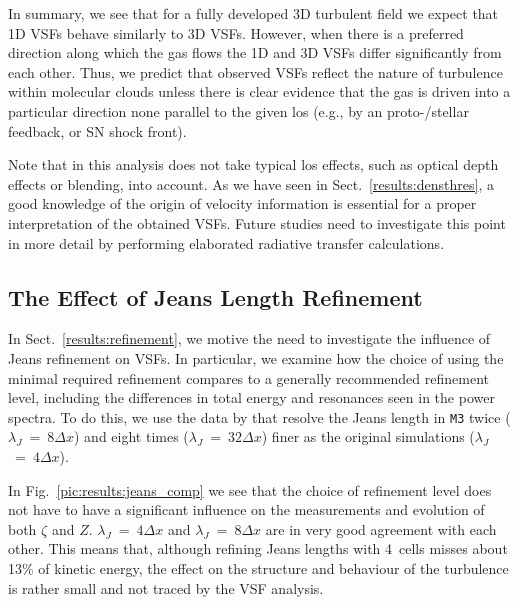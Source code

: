 In summary, we see that for a fully developed 3D turbulent field we expect that 1D VSFs behave similarly to 3D VSFs.
However, when there is a preferred direction along which the gas flows the 1D and 3D VSFs differ significantly from each other. 
Thus, we predict that observed VSFs reflect the nature of turbulence within molecular clouds unless there is clear evidence that the gas is driven into a particular direction none parallel to the given los (e.g., by an proto-/stellar feedback, or SN shock front).

Note that in this analysis does not take typical los effects, such as optical depth effects or blending, into account. 
As we have seen in Sect.~\ref{results:densthres}, a good knowledge of the origin of velocity information is essential for a proper interpretation of the obtained VSFs.
Future studies need to investigate this point in more detail by performing elaborated radiative transfer calculations. 



\subsection{The Effect of Jeans Length Refinement}\label{discussion:refinement}

In Sect.~\ref{results:refinement}, we motive the need to investigate the influence of Jeans refinement on VSFs.
In particular, we examine how the choice of using the minimal required refinement compares to a generally recommended refinement level, including the differences in total energy and resonances seen in the power spectra. 
To do this, we use the data by  that resolve the Jeans length in \texttt{M3} twice ($\lambda_J$~=~$8\Delta{}x$) and eight times ($\lambda_J$~=~$32\Delta{}x$) finer as the original simulations ($\lambda_J$~=~$4\Delta{}x$).

In Fig.~\ref{pic:results:jeans_comp} we see that the choice of refinement level does not have to have a significant influence on the measurements and evolution of both $\zeta$ and $Z$. 
$\lambda_J$~=~$4\Delta{}x$ and $\lambda_J$~=~$8\Delta{}x$ are in very good agreement with each other.
This means that, although refining Jeans lengths with 4~cells misses about 13\% of kinetic energy, the effect on the structure and behaviour of the turbulence is rather small and not traced by the VSF analysis.

